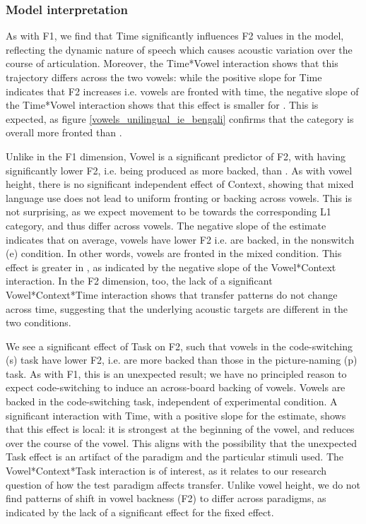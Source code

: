 \documentclass[12 pt]{article}
\newcommand{\nt}[1]{\textipa{[#1]}} %
\begin{document}
\subsubsection*{Model interpretation}

As with F1, we find that Time significantly influences F2 values in the model, reflecting the dynamic nature of speech which causes acoustic variation over the course of articulation. Moreover, the Time*Vowel interaction shows that this trajectory differs across the two vowels: while the positive slope for Time indicates that F2 increases i.e. vowels are fronted with time, the negative slope of the Time*Vowel interaction shows that this effect is smaller for \nt{2}. This is expected, as figure \ref{vowels_unilingual_ie_bengali} confirms that the category \nt{\ae} is overall more fronted than \nt{2}. 

Unlike in the F1 dimension, Vowel is a significant predictor of F2, with \nt{2} having significantly lower F2, i.e. being produced as more backed, than \nt{\ae}. As with vowel height, there is no significant independent effect of Context, showing that mixed language use does not lead to uniform fronting or backing across vowels. This is not surprising, as we expect movement to be towards the corresponding L1 category, and thus differ across vowels. The negative slope of the estimate indicates that on average, vowels have lower F2 i.e. are backed, in the nonswitch (e) condition. In other words, vowels are fronted in the mixed condition. This effect is greater in \nt{\ae}, as indicated by the negative slope of the Vowel*Context interaction. In the F2 dimension, too, the lack of a significant Vowel*Context*Time interaction shows that transfer patterns do not change across time, suggesting that the underlying acoustic targets are different in the two conditions.
 
We see a significant effect of Task on F2, such that vowels in the code-switching (s) task have lower F2, i.e. are more backed than those in the picture-naming (p) task. As with F1, this is an unexpected result; we have no principled reason to expect code-switching to induce an across-board backing of vowels. Vowels are backed in the code-switching task, independent of experimental condition. A significant interaction with Time, with a positive slope for the estimate, shows that this effect is local: it is strongest at the beginning of the vowel, and reduces over the course of the vowel. This aligns with the possibility that the unexpected Task effect is an artifact of the paradigm and the particular stimuli used. The Vowel*Context*Task interaction is of interest, as it relates to our research question of how the test paradigm affects transfer. Unlike vowel height, we do not find patterns of shift in vowel backness (F2) to differ across paradigms, as indicated by the lack of a significant effect for the fixed effect. 
\end{document}
